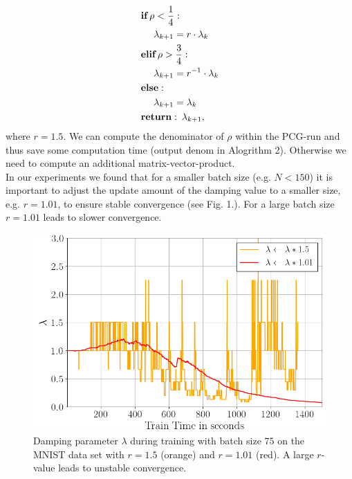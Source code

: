 \documentclass[conference]{IEEEtran}
\begin{document}
	\begin{align}
	&\textbf{if}\:\rho<\frac{1}{4}:\notag\\
	&\text{ }\text{ }\text{ }\text{ }\lambda_{k+1} = r\cdot\lambda_{k}\notag\\
	&\textbf{elif}\:\rho>\frac{3}{4}:\notag\\
	&\text{ }\text{ }\text{ }\text{ }\lambda_{k + 1} = r^{-1}\cdot\lambda_{k}\notag\\
	&\textbf{else}: \notag\\
	&\text{ }\text{ }\text{ }\text{ }\lambda_{k + 1} = \lambda_{k}\notag\\
	&\textbf{return}:\:\lambda_{k + 1},
	\end{align}
	where $r=1.5$. We can compute the denominator of $\rho$ within the PCG-run and thus save some computation time (output denom in Alogrithm 2). Otherwise we need to compute an additional matrix-vector-product.\\
	In our experiments we found that for a smaller batch size (e.g. $N<150$) it is important to adjust the update amount of the damping value to a smaller size, e.g. $r=1.01$, to ensure stable convergence (see Fig. 1.). For a large batch size $r=1.01$ leads to slower convergence.
	
	\begin{figure}[htbp]
		\centerline{\includegraphics[scale=0.52]{lambda.png}}
		\caption{Damping parameter $\lambda$ during training with batch size $75$ on the MNIST data set with $r=1.5$ (orange) and $r=1.01$ (red). A large $r$-value leads to unstable convergence.}
		\label{fig1}
	\end{figure}
	
	
\end{document}
